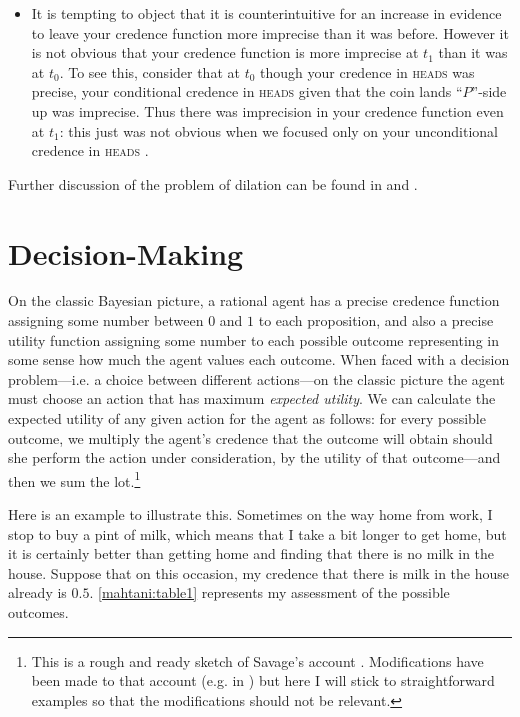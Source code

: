 \begin{itemize}
  \item It is tempting to object that it is counterintuitive for an increase in evidence to leave your credence function more imprecise than it was before. However it is not obvious that your credence function is more imprecise at $t_1$ than it was at $t_0$. To see this, consider that at $t_0$ though your credence in \textsc{heads} was precise, your conditional credence in \textsc{heads} given that the coin lands ``$P$''-side up was imprecise. Thus there was imprecision in your credence function even at $t_1$: this just was not obvious when we focused only on your unconditional credence in \textsc{heads} \citep{bradleyMS}.
\end{itemize}
	

Further discussion of the problem of dilation can be found in \citet{bradleyMS,bradleysteele2014a,dodd2013,Joyce2010} and \citet{pedersonwheeler2014}.


\section{Decision-Making}

On the classic Bayesian picture, a rational agent has a precise credence function assigning some number between $0$ and $1$ to each proposition, and also a precise utility function assigning some number to each possible outcome representing in some sense how much the agent values each outcome. When faced with a decision problem---i.e. a choice between different actions---on the classic picture the agent must choose an action that has maximum \textit{expected utility}. We can calculate the expected utility of any given action for the agent as follows: for every possible outcome, we multiply the agent's credence that the outcome will obtain should she perform the action under consideration, by the utility of that outcome---and then we sum the lot.\footnote{This is a rough and ready sketch of Savage's account \citep{Savage1954}. Modifications have been made to that account (e.g. in \citealp{jeffrey1965}) but here I will stick to straightforward examples so that the modifications should not be relevant.} 
  
Here is an example to illustrate this. Sometimes on the way home from work, I stop to buy a pint of milk, which means that I take a bit longer to get home, but it is certainly better than getting home and finding that there is no milk in the house. Suppose that on this occasion, my credence that there is milk in the house already is $0.5$. \autoref{mahtani:table1} represents my assessment of the possible outcomes. 

